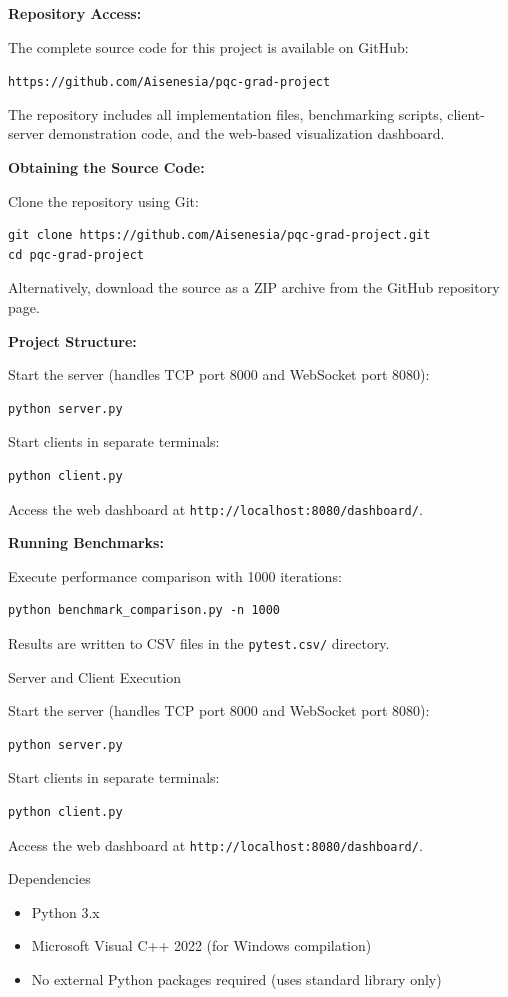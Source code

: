 \textbf{Repository Access:}

The complete source code for this project is available on GitHub:

\begin{center}
\texttt{https://github.com/Aisenesia/pqc-grad-project}
\end{center}

The repository includes all implementation files, benchmarking scripts, client-server demonstration code, and the web-based visualization dashboard.

\textbf{Obtaining the Source Code:}

Clone the repository using Git:
\begin{verbatim}
git clone https://github.com/Aisenesia/pqc-grad-project.git
cd pqc-grad-project
\end{verbatim}

Alternatively, download the source as a ZIP archive from the GitHub repository page.

\textbf{Project Structure:}

Start the server (handles TCP port 8000 and WebSocket port 8080):
\begin{verbatim}
python server.py
\end{verbatim}

Start clients in separate terminals:
\begin{verbatim}
python client.py
\end{verbatim}

Access the web dashboard at \texttt{http://localhost:8080/dashboard/}.

\textbf{Running Benchmarks:}

Execute performance comparison with 1000 iterations:
\begin{verbatim}
python benchmark_comparison.py -n 1000
\end{verbatim}

Results are written to CSV files in the \texttt{pytest.csv/} directory.

Server and Client Execution

Start the server (handles TCP port 8000 and WebSocket port 8080):
\begin{verbatim}
python server.py
\end{verbatim}

Start clients in separate terminals:
\begin{verbatim}
python client.py
\end{verbatim}

Access the web dashboard at \texttt{http://localhost:8080/dashboard/}.

Dependencies

\begin{itemize}
\item Python 3.x
\item Microsoft Visual C++ 2022 (for Windows compilation)
\item No external Python packages required (uses standard library only)
\end{itemize}